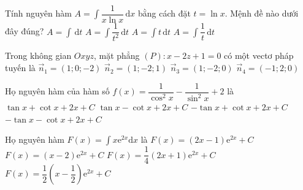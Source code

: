 \begin{ex}%
Tính nguyên hàm $A=\displaystyle\int\limits \dfrac{1}{x\ln {x}}\mathrm{\,d}x$ bằng cách đặt $t=\ln {x}$. Mệnh đề nào dưới đây đúng?
\choice
{$A=\displaystyle\int\limits \mathrm{\,d}t$}
{$A=\displaystyle\int\limits \dfrac{1}{t^2} \mathrm{\,d}t$}
{$A=\displaystyle\int\limits t \mathrm{\,d}t$}
{\True $A=\displaystyle\int\limits \dfrac{1}{t} \mathrm{\,d}t$}
\end{ex}

\begin{ex}%
Trong không gian $O x y z$, mặt phẳng $(P): x-2 z+1=0$ có một vectơ pháp tuyến là
\choice
{\True $\vec{n}_{1}=(1 ; 0 ;-2)$}
{$\vec{n}_{2}=(1 ;-2 ; 1)$}
{$\vec{n}_{3}=(1 ;-2 ; 0)$}
{$\vec{n}_{4}=(-1 ; 2 ; 0)$}
\end{ex}

\begin{ex}%
Họ nguyên hàm của hàm số $f(x)=\dfrac{1}{\cos^2 x}-\dfrac{1}{\sin^2 x}+2$ là
\choice
{\True $\tan x+\cot x+2x+C$}
{$\tan x-\cot x+2x+C$}
{$-\tan x+\cot x+2x+C$}
{$-\tan x-\cot x+2x+C$}
\end{ex}

\begin{ex}%
Họ nguyên hàm $F(x)=\displaystyle\int x\mathrm{e}^{2x}\mathrm{d}x$ là
\choice
{$F(x)=(2x-1)\mathrm{e}^{2x}+C$}
{$F(x)=(x-2)\mathrm{e}^{2x}+C$}
{$F(x)=\dfrac{1}{4}(2x+1)\mathrm{e}^{2x}+C$}
{\True $F(x)=\dfrac{1}{2}\left(x-\dfrac{1}{2}\right)\mathrm{e}^{2x}+C$}
\end{ex}


